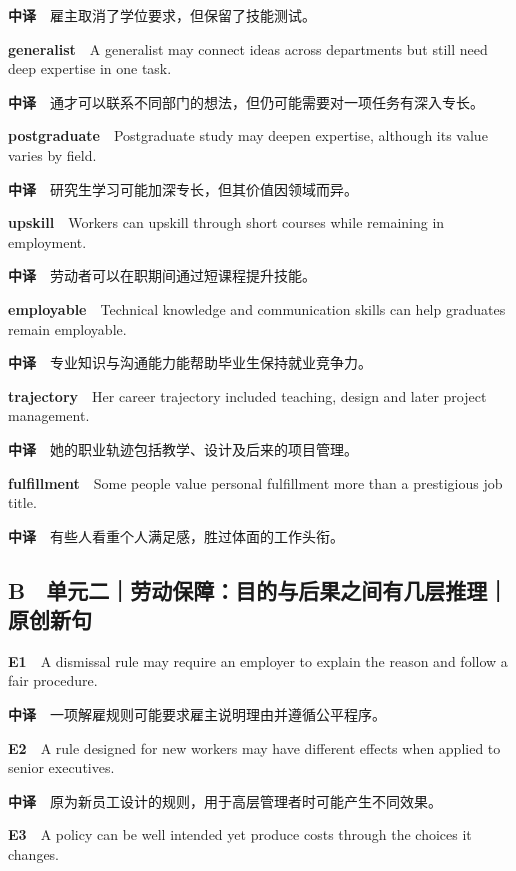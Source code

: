 \documentclass[
  11pt,
]{ctexart}
\begin{document}
\textbf{中译}　雇主取消了学位要求，但保留了技能测试。

\textbf{generalist}　A generalist may connect ideas across departments
but still need deep expertise in one task.

\textbf{中译}　通才可以联系不同部门的想法，但仍可能需要对一项任务有深入专长。

\textbf{postgraduate}　Postgraduate study may deepen expertise, although
its value varies by field.

\textbf{中译}　研究生学习可能加深专长，但其价值因领域而异。

\textbf{upskill}　Workers can upskill through short courses while
remaining in employment.

\textbf{中译}　劳动者可以在职期间通过短课程提升技能。

\textbf{employable}　Technical knowledge and communication skills can
help graduates remain employable.

\textbf{中译}　专业知识与沟通能力能帮助毕业生保持就业竞争力。

\textbf{trajectory}　Her career trajectory included teaching, design and
later project management.

\textbf{中译}　她的职业轨迹包括教学、设计及后来的项目管理。

\textbf{fulfillment}　Some people value personal fulfillment more than a
prestigious job title.

\textbf{中译}　有些人看重个人满足感，胜过体面的工作头衔。

\subsection{B　单元二｜劳动保障：目的与后果之间有几层推理｜原创新句}\label{b-ux5355ux5143ux4e8cux52b3ux52a8ux4fddux969cux76eeux7684ux4e0eux540eux679cux4e4bux95f4ux6709ux51e0ux5c42ux63a8ux7406ux539fux521bux65b0ux53e5}

\textbf{E1}　A dismissal rule may require an employer to explain the
reason and follow a fair procedure.

\textbf{中译}　一项解雇规则可能要求雇主说明理由并遵循公平程序。

\textbf{E2}　A rule designed for new workers may have different effects
when applied to senior executives.

\textbf{中译}　原为新员工设计的规则，用于高层管理者时可能产生不同效果。

\textbf{E3}　A policy can be well intended yet produce costs through the
choices it changes.
\end{document}
